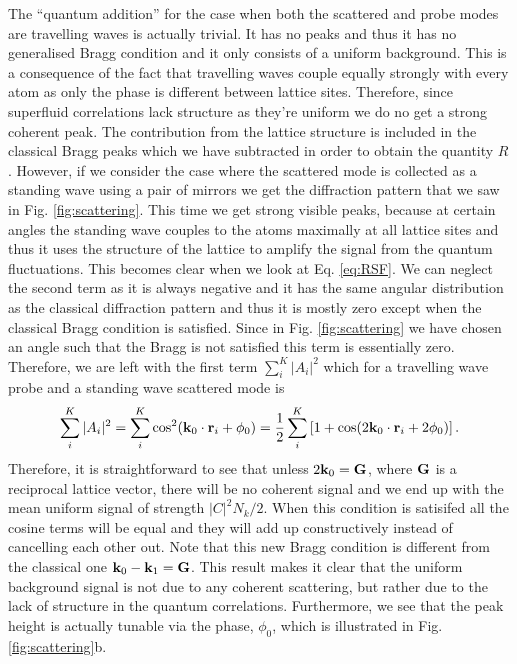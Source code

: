 The ``quantum addition'' for the case when both the scattered and
probe modes are travelling waves is actually trivial. It has no peaks
and thus it has no generalised Bragg condition and it only consists of
a uniform background. This is a consequence of the fact that
travelling waves couple equally strongly with every atom as only the
phase is different between lattice sites. Therefore, since superfluid
correlations lack structure as they're uniform we do no get a strong
coherent peak. The contribution from the lattice structure is included
in the classical Bragg peaks which we have subtracted in order to
obtain the quantity $R$. However, if we consider the case where the
scattered mode is collected as a standing wave using a pair of mirrors
we get the diffraction pattern that we saw in
Fig. \ref{fig:scattering}. This time we get strong visible peaks,
because at certain angles the standing wave couples to the atoms
maximally at all lattice sites and thus it uses the structure of the
lattice to amplify the signal from the quantum fluctuations. This
becomes clear when we look at Eq. \eqref{eq:RSF}. We can neglect the
second term as it is always negative and it has the same angular
distribution as the classical diffraction pattern and thus it is
mostly zero except when the classical Bragg condition is
satisfied. Since in Fig. \ref{fig:scattering} we have chosen an angle
such that the Bragg is not satisfied this term is essentially
zero. Therefore, we are left with the first term $\sum_i^K |A_i|^2$
which for a travelling wave probe and a standing wave scattered mode
is
\begin{equation}
  \sum_i^K |A_i|^2 = \sum_i^K \cos^2(\mathbf{k}_0 \cdot \mathbf{r}_i + \phi_0) =
  \frac{1}{2} \sum_i^K \left[1 + \cos(2 \mathbf{k}_0 \cdot \mathbf{r}_i + 2
    \phi_0) \right].
\end{equation}
Therefore, it is straightforward to see that unless
$2 \mathbf{k}_0 = \mathbf{G}$, where $\mathbf{G}$ is a reciprocal lattice vector,
there will be no coherent signal and we end up with the mean uniform
signal of strength $|C|^2 N_k/2$. When this condition is satisifed all
the cosine terms will be equal and they will add up constructively
instead of cancelling each other out. Note that this new Bragg
condition is different from the classical one
$\mathbf{k}_0 - \mathbf{k}_1 = \mathbf{G}$. This result makes it clear that the
uniform background signal is not due to any coherent scattering, but
rather due to the lack of structure in the quantum
correlations. Furthermore, we see that the peak height is actually
tunable via the phase, $\phi_0$, which is illustrated in
Fig. \ref{fig:scattering}b.

